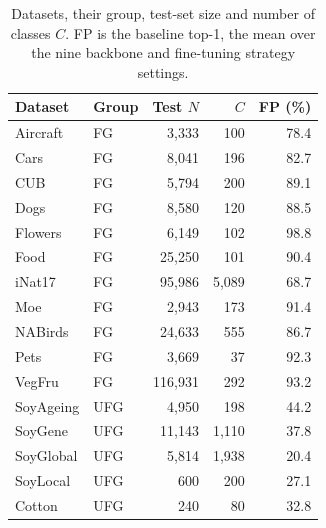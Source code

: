 \begin{table}[t]
\centering
\caption{Datasets, their group, test-set size and number of classes $C$. FP is the baseline top-1, the mean over the nine backbone and fine-tuning strategy settings.}
\label{tab:datasets}
\setlength{\tabcolsep}{2.5pt}
\small
\begin{tabular}{llrrr}
\toprule
Dataset & Group & Test $N$ & $C$ & FP (\%) \\
\midrule
Aircraft & FG & 3{,}333 & 100 & 78.4 \\
Cars & FG & 8{,}041 & 196 & 82.7 \\
CUB & FG & 5{,}794 & 200 & 89.1 \\
Dogs & FG & 8{,}580 & 120 & 88.5 \\
Flowers & FG & 6{,}149 & 102 & 98.8 \\
Food & FG & 25{,}250 & 101 & 90.4 \\
iNat17 & FG & 95{,}986 & 5{,}089 & 68.7 \\
Moe & FG & 2{,}943 & 173 & 91.4 \\
NABirds & FG & 24{,}633 & 555 & 86.7 \\
Pets & FG & 3{,}669 & 37 & 92.3 \\
VegFru & FG & 116{,}931 & 292 & 93.2 \\
SoyAgeing & UFG & 4{,}950 & 198 & 44.2 \\
SoyGene & UFG & 11{,}143 & 1{,}110 & 37.8 \\
SoyGlobal & UFG & 5{,}814 & 1{,}938 & 20.4 \\
SoyLocal & UFG & 600 & 200 & 27.1 \\
Cotton & UFG & 240 & 80 & 32.8 \\
\bottomrule
\end{tabular}
\end{table}
